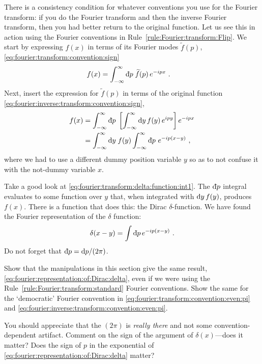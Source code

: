 \documentclass[12pt, oneside]{report}    %
\begin{document}
There is a consistency condition for whatever conventions you use for the Fourier transform: if you do the Fourier transform and then the inverse Fourier transform, then you had better return to the original function. Let us see this in action using the Fourier conventions in Rule~\ref{rule:Fourier:transform:Flip}. We start by expressing $f(x)$ in terms of its Fourier modes $\tilde f(p)$, \eqref{eq:fourier:transform:convention:sign}
\begin{align}
    f(x) &= 
    \int_{-\infty}^\infty \Dbar{p}\; 
    \tilde f(p)\,
    e^{-ipx} 
    \ .
\end{align}
Next, insert the expression for $\tilde f(p)$ in terms of the original function \eqref{eq:fourier:inverse:transform:convention:sign},
\begin{align}
f(x) &= 
    \int_{-\infty}^\infty \Dbar{p}\; 
    \left[
     \int_{-\infty}^\infty \D{y}\, f(y)\, e^{ipy} 
    \right]
    e^{-ipx} 
    \\
    &=
    \int_{-\infty}^\infty \D{y}\; f(y)
    \int_{-\infty}^\infty \Dbar{p}\, \, e^{-ip(x-y)} 
    \ ,
    \label{eq:fourier:transform:delta:function:int1}
\end{align}
where we had to use a different dummy position variable $y$ so as to not confuse it with the not-dummy variable $x$. 

Take a good look at \eqref{eq:fourier:transform:delta:function:int1}. The $\Dbar{p}$ integral evaluates to some function over $y$ that, when integrated with $\operatorname{d}\!{y}\, f(y)$, produces $f(x)$. There is a function that does this: the Dirac $\delta$-function. We have found the Fourier representation of the $\delta$ function:
\begin{align}
    \delta(x-y) = \int \Dbar{p}\, e^{-ip(x-y)} \ .
    \label{eq:fourier:representation:of:Dirac:delta}
\end{align}
Do not forget that $\Dbar{p} = \D{p}/(2\pi)$.

\begin{exercise}
Show that the manipulations in this section give the same result, \eqref{eq:fourier:representation:of:Dirac:delta}, even if we were using the Rule~\ref{rule:Fourier:transform:standard} Fourier conventions. Show the same for the `democratic' Fourier convention in \eqref{eq:fourier:transform:convention:even:pi} and \eqref{eq:fourier:inverse:transform:convention:even:pi}.

You should appreciate that the $(2\pi)$ is \emph{really there} and not some convention-dependent artifact. Comment on the sign of the argument of $\delta(x)$---does it matter? Does the sign of $p$ in the exponential of \eqref{eq:fourier:representation:of:Dirac:delta} matter?
\end{exercise}
\end{document}
